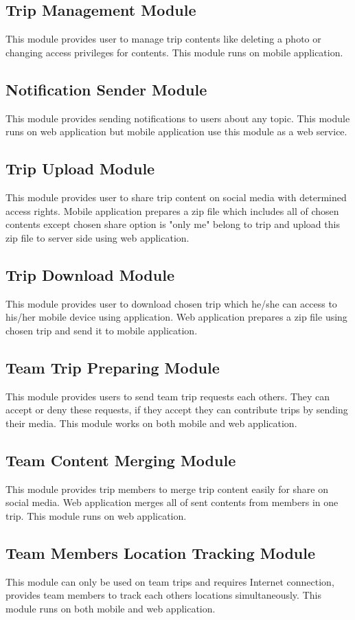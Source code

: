 \subsection{Trip Management Module}
This module provides user to manage trip contents like deleting a photo or changing access privileges for contents. This module runs on mobile application.
\subsection{Notification Sender Module}   
This module provides sending notifications to users about any topic. This module runs on web application but mobile application use this module as a web service.
\subsection{Trip Upload Module}
This module provides user to share trip content on social media with determined access rights. Mobile application prepares a zip file which includes all of chosen contents except chosen share option is "only me" belong to trip and upload this zip file to server side using web application.
\subsection{Trip Download Module}
This module provides user to download chosen trip  which he/she can access to his/her mobile device using application. Web application prepares a zip file using chosen trip and send it to mobile application.
\subsection{Team Trip Preparing Module}
This module provides users to send team trip requests each others. They can accept or deny these requests, if they accept they can contribute trips by sending their media. This module works on both mobile and web application.

\subsection{Team Content Merging Module}
This module provides trip members to merge trip content easily for share on social media. Web application merges all of sent contents from members in one trip. This module runs on web application.

\subsection{Team Members Location Tracking Module}
This module can only be used on team trips and requires Internet connection, provides team members to track each others locations simultaneously. This module runs on both mobile  and web application.
   
